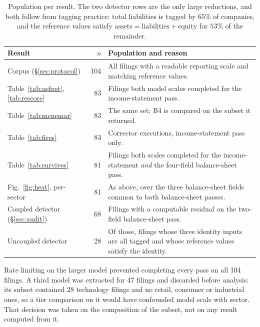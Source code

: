 \documentclass[11pt]{article}
\begin{document}
\begin{table}[h]
\centering\small
\begin{tabular}{@{}p{2.1cm}rp{4.2cm}@{}}
\toprule
\textbf{Result} & \textbf{$n$} & \textbf{Population and reason} \\
\midrule
Corpus (\S\ref{sec:protocol}) & 104 &
All filings with a readable reporting scale and matching reference values. \\
\addlinespace[2pt]
Table~\ref{tab:asfirst}, \ref{tab:rescore} & 83 &
Filings both model scales completed for the income-statement pass. \\
\addlinespace[2pt]
Table~\ref{tab:mcnemar} & 83 &
The same set; B4 is compared on the subset it returned. \\
\addlinespace[2pt]
Table~\ref{tab:fires} & 83 &
Corrector executions, income-statement pass only. \\
\addlinespace[2pt]
Table~\ref{tab:survives} & 81 &
Filings both scales completed for the income-statement \emph{and} the four-field
balance-sheet pass. \\
\addlinespace[2pt]
Fig.~\ref{fig:heat}, per-sector & 81 &
As above, over the three balance-sheet fields common to both balance-sheet passes. \\
\addlinespace[2pt]
Coupled detector (\S\ref{sec:audit}) & 68 &
Filings with a computable residual on the two-field balance-sheet pass. \\
\addlinespace[2pt]
Uncoupled detector & 28 &
Of those, filings whose three identity inputs are all tagged and whose reference values
satisfy the identity. \\
\bottomrule
\end{tabular}
\caption{Population per result. The two detector rows are the only large reductions, and
both follow from tagging practice: total liabilities is tagged by $65\%$ of companies,
and the reference values satisfy
$\text{assets}=\text{liabilities}+\text{equity}$ for $53\%$ of the remainder.}
\label{tab:populations}
\end{table}

Rate limiting on the larger model prevented completing every pass on all 104 filings.
A third model was extracted for 47 filings and discarded before analysis: its subset
contained 28 technology filings and no retail, consumer or industrial ones, so a tier
comparison on it would have confounded model scale with sector. That decision was taken
on the composition of the subset, not on any result computed from it.
\end{document}
